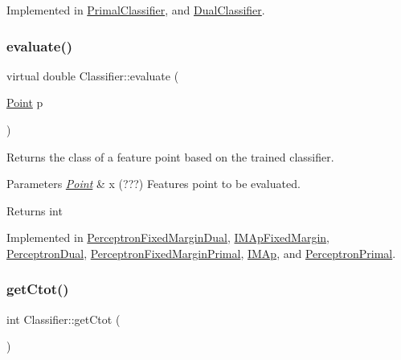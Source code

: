 Implemented in \hyperlink{class_primal_classifier_af5117ae286ed7f06430b98f433e9bf62}{Primal\+Classifier}, and \hyperlink{class_dual_classifier_afbede25a3e30b87503c0c6555d52f358}{Dual\+Classifier}.

\mbox{\label{class_classifier_ae8e9554823b85ddc2dcad2955da811d9}} 
\subsubsection{\texorpdfstring{evaluate()}{evaluate()}}
{\footnotesize\ttfamily virtual double Classifier\+::evaluate (\begin{DoxyParamCaption}\item[{\hyperlink{class_point}{Point}}]{p }\end{DoxyParamCaption})\hspace{0.3cm}{\ttfamily [pure virtual]}}



Returns the class of a feature point based on the trained classifier. 


\begin{DoxyParams}{Parameters}
{\em \hyperlink{class_point}{Point}} & x (???) Features point to be evaluated. \\
\hline
\end{DoxyParams}
\begin{DoxyReturn}{Returns}
int 
\end{DoxyReturn}


Implemented in \hyperlink{class_perceptron_fixed_margin_dual_a1370fdbc95bf728f82a83f219be32d23}{Perceptron\+Fixed\+Margin\+Dual}, \hyperlink{class_i_m_ap_fixed_margin_a230aae2c6ef3f70b2e1a704b5e4dff28}{I\+M\+Ap\+Fixed\+Margin}, \hyperlink{class_perceptron_dual_a3ed5554b85b4b1ec98f57acab3eeeaca}{Perceptron\+Dual}, \hyperlink{class_perceptron_fixed_margin_primal_af72c3dde96f1f1b803c7b522b5c1cc0f}{Perceptron\+Fixed\+Margin\+Primal}, \hyperlink{class_i_m_ap_aee497c8ff854b8d584c6c9df0c57ad57}{I\+M\+Ap}, and \hyperlink{class_perceptron_primal_ac8ce9ceffe2b35b5386e5367fb419b3b}{Perceptron\+Primal}.

\mbox{\label{class_classifier_ab80a78cd6a4efc59b16f5b80cd64dc63}} 
\subsubsection{\texorpdfstring{get\+Ctot()}{getCtot()}}
{\footnotesize\ttfamily int Classifier\+::get\+Ctot (\begin{DoxyParamCaption}{ }\end{DoxyParamCaption})\hspace{0.3cm}{\ttfamily [inline]}}



